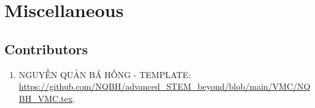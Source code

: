 \documentclass{article}
\begin{document}
\section{Miscellaneous}

\subsection{Contributors}

\begin{enumerate}
	\item {\sc NGUYỄN QUẢN BÁ HỒNG - TEMPLATE}: \url{https://github.com/NQBH/advanced_STEM_beyond/blob/main/VMC/NQBH_VMC.tex}.
\end{enumerate}


\printbibliography[heading=bibintoc]
	
\end{document}
